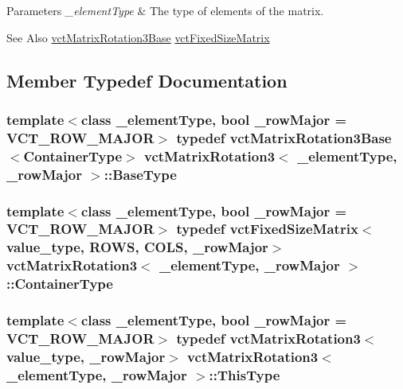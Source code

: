 \begin{DoxyParams}{Parameters}
{\em \-\_\-element\-Type} & The type of elements of the matrix.\\
\hline
\end{DoxyParams}
\begin{DoxySeeAlso}{See Also}
\hyperlink{classvct_matrix_rotation3_base}{vct\-Matrix\-Rotation3\-Base} \hyperlink{classvct_fixed_size_matrix}{vct\-Fixed\-Size\-Matrix} 
\end{DoxySeeAlso}


\subsection{Member Typedef Documentation}
\hypertarget{classvct_matrix_rotation3_a548c9a746fae0bfb7b4b1466a872f4dd}{
\subsubsection[{Base\-Type}]{\setlength{\rightskip}{0pt plus 5cm}template$<$class \-\_\-element\-Type, bool \-\_\-row\-Major = V\-C\-T\-\_\-\-R\-O\-W\-\_\-\-M\-A\-J\-O\-R$>$ typedef {\bf vct\-Matrix\-Rotation3\-Base}$<${\bf Container\-Type}$>$ {\bf vct\-Matrix\-Rotation3}$<$ \-\_\-element\-Type, \-\_\-row\-Major $>$\-::{\bf Base\-Type}}}\label{classvct_matrix_rotation3_a548c9a746fae0bfb7b4b1466a872f4dd}
\hypertarget{classvct_matrix_rotation3_a1f8796d5368dbda35c3b57c6395b6dd0}{
\subsubsection[{Container\-Type}]{\setlength{\rightskip}{0pt plus 5cm}template$<$class \-\_\-element\-Type, bool \-\_\-row\-Major = V\-C\-T\-\_\-\-R\-O\-W\-\_\-\-M\-A\-J\-O\-R$>$ typedef {\bf vct\-Fixed\-Size\-Matrix}$<$value\-\_\-type, {\bf R\-O\-W\-S}, {\bf C\-O\-L\-S}, \-\_\-row\-Major$>$ {\bf vct\-Matrix\-Rotation3}$<$ \-\_\-element\-Type, \-\_\-row\-Major $>$\-::{\bf Container\-Type}}}\label{classvct_matrix_rotation3_a1f8796d5368dbda35c3b57c6395b6dd0}
\hypertarget{classvct_matrix_rotation3_adb3687819aa485dec149239047be7c50}{
\subsubsection[{This\-Type}]{\setlength{\rightskip}{0pt plus 5cm}template$<$class \-\_\-element\-Type, bool \-\_\-row\-Major = V\-C\-T\-\_\-\-R\-O\-W\-\_\-\-M\-A\-J\-O\-R$>$ typedef {\bf vct\-Matrix\-Rotation3}$<$value\-\_\-type, \-\_\-row\-Major$>$ {\bf vct\-Matrix\-Rotation3}$<$ \-\_\-element\-Type, \-\_\-row\-Major $>$\-::{\bf This\-Type}}}\label{classvct_matrix_rotation3_adb3687819aa485dec149239047be7c50}

